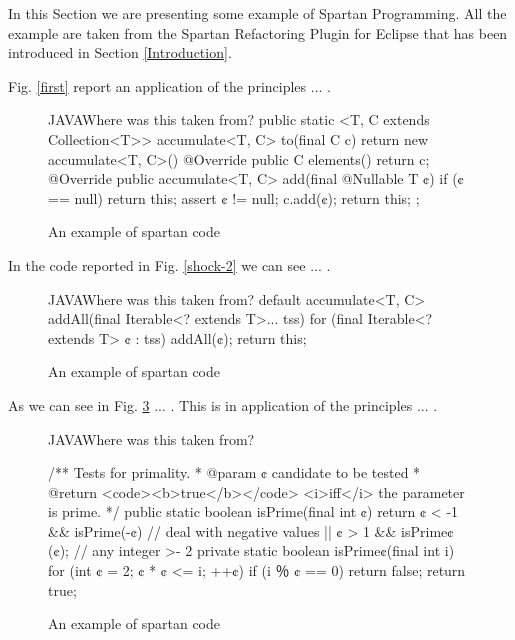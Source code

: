 % 
% 

In this Section we are presenting some example of Spartan Programming. 
All the example are taken from the Spartan Refactoring Plugin for Eclipse that 
has been introduced in Section \ref{Introduction}. 

Fig. \ref{first} report an application of the principles ... .

\begin{figure}[h]
\label{figure:first}
\caption{An example of spartan code}
  \begin{Code}{JAVA}{Where was this taken from?}
public static <T, C extends Collection<T>> accumulate<T, C> 
  to(final C c) {
    return new accumulate<T, C>() {
      @Override public C elements() {
        return c;
      }
      @Override public accumulate<T, C> 
        add(final @Nullable T ¢) {
          if (¢ == null)
            return this;
          assert ¢ != null;
          c.add(¢);
          return this;
        }
    };
  }
\end{Code}
\end{figure}

In the code reported in Fig. \ref{shock-2} we can see ... .

\begin{figure}[h]
\label{figure:shock-2}
\caption{An example of spartan code}
\begin{Code}{JAVA}{Where was this taken from?}
default accumulate<T, C> 
    addAll(final Iterable<? extends T>... tss) {
      for (final Iterable<? extends T> ¢ : tss)
        addAll(¢);
      return this;
    }
\end{Code}

\end{figure}

As we can see in Fig. \ref{figure:shock-2} ... . This is 
in application of the principles ... .

\begin{figure}[h]
\begin{Code}{JAVA}{Where was this taken from?}
\label{figure:shock-2}
\caption{An example of spartan code}
/** Tests for primality.
  * @param ¢ candidate to be tested
  * @return <code><b>true</b></code> <i>iff</i> the parameter is prime. */
public static boolean isPrime(final int ¢) {
  return ¢ < -1 && isPrime(-¢) // deal with negative values
      || ¢ > 1 && isPrime¢(¢); // any integer >- 2
}
private static boolean isPrime¢(final int i) {
  for (int ¢ = 2; ¢ * ¢ <= i; ++¢)
    if (i ％ ¢ == 0)
      return false;
  return true;
}
\end{Code}
\end{figure}

